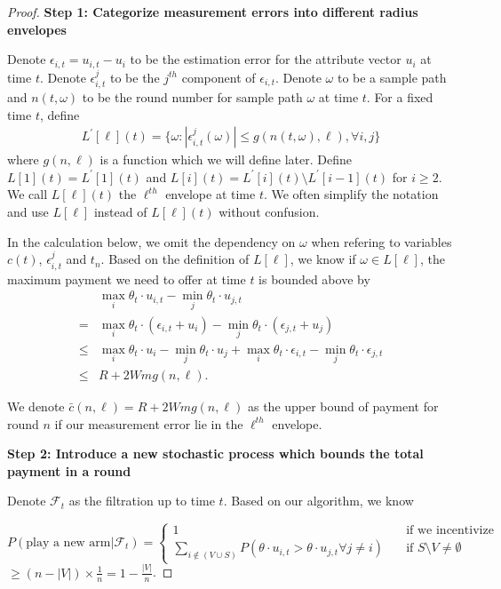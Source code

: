 \documentclass[twoside,11pt]{article}
\begin{document}
\begin{proof}

\noindent\textbf{Step 1: Categorize measurement errors into different radius envelopes}


Denote $\epsilon_{i,t}=u_{i,t}-u_{i}$ to be the estimation error for the attribute vector $u_i$ at time $t$. Denote $\epsilon_{i,t}^{j}$ to be the $j^{th}$ component of $\epsilon_{i,t}$. Denote $\omega$ to be a sample path and $n(t,\omega)$ to be the round number for sample path $\omega$ at time $t$. For a fixed time $t$, define
\begin{align}
L^{'}[\ell](t) = \{\omega:|\epsilon_{i,t}^{j}(\omega)|\leq g(n(t,\omega),\ell), \forall i,j\}\nonumber
\end{align}
where $g(n,\ell)$ is a function which we will define later. Define $L[1](t) = L^{'}[1](t)$ and $L[i](t) = L^{'}[i](t)\setminus L^{'}[i-1](t)$ for $i\geq 2$. We call $L[\ell](t)$ the $\ell^{th}$ envelope at time $t$. We often simplify the notation and use $L[\ell]$ instead of $L[\ell](t)$ without confusion.

In the calculation below, we omit the dependency on $\omega$ when refering to variables $c(t)$, $\epsilon_{i,t}^{j}$ and $t_n$. Based on the definition of $L[\ell]$, we know if $\omega\in L[\ell]$, the maximum payment we need to offer at time $t$ is bounded above by 
\begin{align}
&\max_{i}\theta_t\cdot u_{i,t} - \min_{j}\theta_t\cdot u_{j,t} \nonumber \\
= &\max_{i}\theta_t\cdot (\epsilon_{i,t}+u_i) - \min_{j}\theta_t\cdot (\epsilon_{j,t}+u_j) \nonumber \\
\leq &\max_{i}\theta_t\cdot u_i - \min_{j}\theta_t\cdot u_j +\max_{i}\theta_t\cdot \epsilon_{i,t} - \min_{j}\theta_t\cdot \epsilon_{j,t}\nonumber \\
\leq & R + 2Wmg(n,\ell). \nonumber
\end{align}

We denote $\bar{c}(n,\ell)=R + 2Wmg(n,\ell)$ as the upper bound of payment for round $n$ if our measurement error lie in the $\ell^{th}$ envelope.


\noindent\textbf{Step 2: Introduce a new stochastic process which bounds the total payment in a round}

Denote $\mathcal{F}_t$ as the filtration up to time $t$. Based on our algorithm, we know

\[ P(\text{play a new arm}|\mathcal{F}_t) =
  \begin{cases}
    1       & \quad \text{if we incentivize}\\
    \sum_{i\notin (V\cup S)} P(\theta \cdot u_{i,t}>\theta\cdot u_{j,t} \forall j\neq i)  & \quad \text{if }  S\setminus V\neq \emptyset 
  \end{cases} \label{dom_stoc}
\] 
\hspace{1cm}$\geq (n-|V|)\times \frac{1}{n}=1-\frac{|V|}{n}$.


\end{proof}
\end{document}
